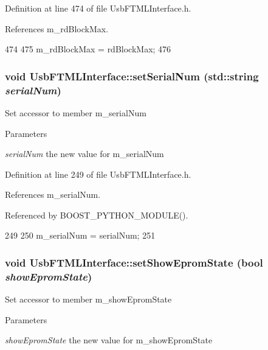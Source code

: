 Definition at line 474 of file UsbFTMLInterface.h.

References m\_\-rdBlockMax.


\begin{DoxyCode}
474                                        {
475     m_rdBlockMax = rdBlockMax;
476   }
\end{DoxyCode}
\hypertarget{classUsbFTMLInterface_a53fda4d42c82362f61544ba7c05beb8a}{
\subsubsection[{setSerialNum}]{\setlength{\rightskip}{0pt plus 5cm}void UsbFTMLInterface::setSerialNum (std::string {\em serialNum})}}
\label{classUsbFTMLInterface_a53fda4d42c82362f61544ba7c05beb8a}
Set accessor to member m\_\-serialNum 
\begin{DoxyParams}{Parameters}
\item[{\em serialNum}]the new value for m\_\-serialNum \end{DoxyParams}


Definition at line 249 of file UsbFTMLInterface.h.

References m\_\-serialNum.

Referenced by BOOST\_\-PYTHON\_\-MODULE().


\begin{DoxyCode}
249                                           {
250     m_serialNum = serialNum;
251   }
\end{DoxyCode}
\hypertarget{classUsbFTMLInterface_a051a6eb8e7fe43c9c97d61f8aafeea8e}{
\subsubsection[{setShowEpromState}]{\setlength{\rightskip}{0pt plus 5cm}void UsbFTMLInterface::setShowEpromState (bool {\em showEpromState})}}
\label{classUsbFTMLInterface_a051a6eb8e7fe43c9c97d61f8aafeea8e}
Set accessor to member m\_\-showEpromState 
\begin{DoxyParams}{Parameters}
\item[{\em showEpromState}]the new value for m\_\-showEpromState \end{DoxyParams}


